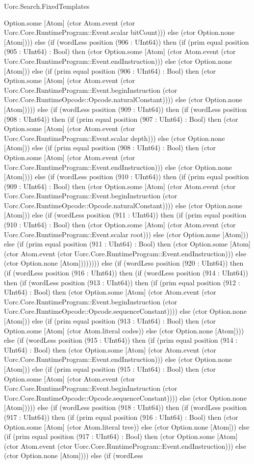 \begin{lexlean}{Uorc.Search.FixedTemplates}
\begin{semanticmodule}
{Option.some [Atom] (ctor Atom.event (ctor Uorc.Core.RuntimeProgram::Event.scalar bitCount))) else (ctor Option.none [Atom]))) else (if (wordLess position (906 : UInt64)) then (if (prim equal position (905 : UInt64) : Bool) then (ctor Option.some [Atom] (ctor Atom.event (ctor Uorc.Core.RuntimeProgram::Event.endInstruction))) else (ctor Option.none [Atom])) else (if (prim equal position (906 : UInt64) : Bool) then (ctor Option.some [Atom] (ctor Atom.event (ctor Uorc.Core.RuntimeProgram::Event.beginInstruction (ctor Uorc.Core.RuntimeOpcode::Opcode.naturalConstant)))) else (ctor Option.none [Atom])))) else (if (wordLess position (909 : UInt64)) then (if (wordLess position (908 : UInt64)) then (if (prim equal position (907 : UInt64) : Bool) then (ctor Option.some [Atom] (ctor Atom.event (ctor Uorc.Core.RuntimeProgram::Event.scalar depth))) else (ctor Option.none [Atom])) else (if (prim equal position (908 : UInt64) : Bool) then (ctor Option.some [Atom] (ctor Atom.event (ctor Uorc.Core.RuntimeProgram::Event.endInstruction))) else (ctor Option.none [Atom]))) else (if (wordLess position (910 : UInt64)) then (if (prim equal position (909 : UInt64) : Bool) then (ctor Option.some [Atom] (ctor Atom.event (ctor Uorc.Core.RuntimeProgram::Event.beginInstruction (ctor Uorc.Core.RuntimeOpcode::Opcode.naturalConstant)))) else (ctor Option.none [Atom])) else (if (wordLess position (911 : UInt64)) then (if (prim equal position (910 : UInt64) : Bool) then (ctor Option.some [Atom] (ctor Atom.event (ctor Uorc.Core.RuntimeProgram::Event.scalar root))) else (ctor Option.none [Atom])) else (if (prim equal position (911 : UInt64) : Bool) then (ctor Option.some [Atom] (ctor Atom.event (ctor Uorc.Core.RuntimeProgram::Event.endInstruction))) else (ctor Option.none [Atom]))))))) else (if (wordLess position (920 : UInt64)) then (if (wordLess position (916 : UInt64)) then (if (wordLess position (914 : UInt64)) then (if (wordLess position (913 : UInt64)) then (if (prim equal position (912 : UInt64) : Bool) then (ctor Option.some [Atom] (ctor Atom.event (ctor Uorc.Core.RuntimeProgram::Event.beginInstruction (ctor Uorc.Core.RuntimeOpcode::Opcode.sequenceConstant)))) else (ctor Option.none [Atom])) else (if (prim equal position (913 : UInt64) : Bool) then (ctor Option.some [Atom] (ctor Atom.literal codes)) else (ctor Option.none [Atom]))) else (if (wordLess position (915 : UInt64)) then (if (prim equal position (914 : UInt64) : Bool) then (ctor Option.some [Atom] (ctor Atom.event (ctor Uorc.Core.RuntimeProgram::Event.endInstruction))) else (ctor Option.none [Atom])) else (if (prim equal position (915 : UInt64) : Bool) then (ctor Option.some [Atom] (ctor Atom.event (ctor Uorc.Core.RuntimeProgram::Event.beginInstruction (ctor Uorc.Core.RuntimeOpcode::Opcode.sequenceConstant)))) else (ctor Option.none [Atom])))) else (if (wordLess position (918 : UInt64)) then (if (wordLess position (917 : UInt64)) then (if (prim equal position (916 : UInt64) : Bool) then (ctor Option.some [Atom] (ctor Atom.literal tree)) else (ctor Option.none [Atom])) else (if (prim equal position (917 : UInt64) : Bool) then (ctor Option.some [Atom] (ctor Atom.event (ctor Uorc.Core.RuntimeProgram::Event.endInstruction))) else (ctor Option.none [Atom]))) else (if (wordLess }
\end{semanticmodule}
\end{lexlean}
